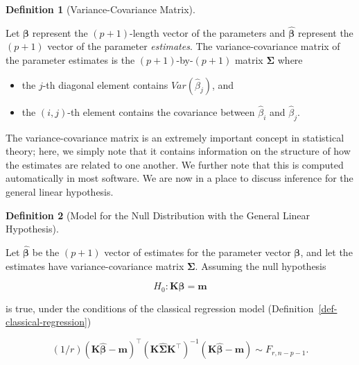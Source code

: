 \documentclass[
  letterpaper,
  DIV=11,
  numbers=noendperiod]{scrreprt}
\providecommand{\tightlist}{%
  \setlength{\itemsep}{0pt}\setlength{\parskip}{0pt}}\usepackage{longtable,booktabs,array}
\theoremstyle{definition}
\newtheorem{definition}{Definition}[chapter]
\theoremstyle{definition}
\theoremstyle{remark}
\begin{document}
\begin{definition}[Variance-Covariance
Matrix]\protect\hypertarget{def-variance-covariance-matrix}{}\label{def-variance-covariance-matrix}

Let \(\boldsymbol{\beta}\) represent the \((p+1)\)-length vector of the
parameters and \(\widehat{\boldsymbol{\beta}}\) represent the \((p+1)\)
vector of the parameter \emph{estimates}. The variance-covariance matrix
of the parameter estimates is the \((p+1)\)-by-\((p+1)\) matrix
\(\boldsymbol{\Sigma}\) where

\begin{itemize}
\tightlist
\item
  the \(j\)-th diagonal element contains
  \(Var\left(\widehat{\beta}_j\right)\), and
\item
  the \((i,j)\)-th element contains the covariance between
  \(\widehat{\beta}_i\) and \(\widehat{\beta}_j\).
\end{itemize}

\end{definition}

The variance-covariance matrix is an extremely important concept in
statistical theory; here, we simply note that it contains information on
the structure of how the estimates are related to one another. We
further note that this is computed automatically in most software. We
are now in a place to discuss inference for the general linear
hypothesis.

\begin{definition}[Model for the Null Distribution with the General
Linear
Hypothesis]\protect\hypertarget{def-general-linear-hypothesis-null}{}\label{def-general-linear-hypothesis-null}

Let \(\widehat{\boldsymbol{\beta}}\) be the \((p+1)\) vector of
estimates for the parameter vector \(\boldsymbol{\beta}\), and let the
estimates have variance-covariance matrix \(\boldsymbol{\Sigma}\).
Assuming the null hypothesis

\[H_0: \mathbf{K} \boldsymbol{\beta} = \mathbf{m}\]

is true, under the conditions of the classical regression model
(Definition~\ref{def-classical-regression})

\[(1/r) \left(\mathbf{K}\widehat{\boldsymbol{\beta}} - \mathbf{m}\right)^\top \left(\mathbf{K}\widehat{\boldsymbol{\Sigma}}\mathbf{K}^\top\right)^{-1} \left(\mathbf{K}\widehat{\boldsymbol{\beta}} - \mathbf{m}\right) \sim F_{r, n-p-1}.\]

\end{definition}
\end{document}
